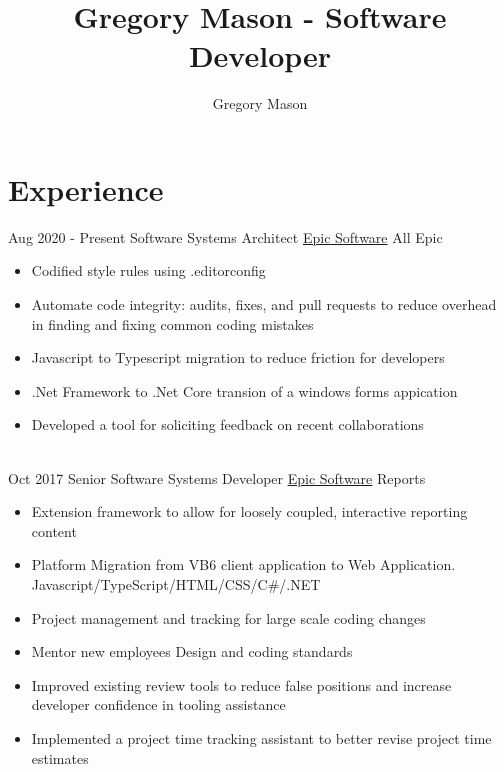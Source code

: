 \documentclass[letterpaper]{twentysecondcv} %
\author{Gregory Mason}
\title{Gregory Mason - Software Developer}
\begin{document}
\makeprofile %


\section{Experience}

\begin{twenty} %
\twentyitem %
{Aug 2020 -}
{Present}
{Software Systems Architect}
{\href{https://www.epic.com/}{Epic Software}}
{All Epic}
{\begin{itemize}
	\item Codified style rules using .editorconfig
	\item Automate code integrity: audits, fixes, and pull requests to reduce overhead in finding and fixing common coding mistakes
	\item Javascript to Typescript migration to reduce friction for developers
	\item .Net Framework to .Net Core transion of a windows forms appication
	\item Developed a tool for soliciting feedback on recent collaborations
\end{itemize}}
\\
\twentyitem
{Oct 2017}
{}
{Senior Software Systems Developer}
{\href{https://www.epic.com/}{Epic Software}}
{Reports}
{\begin{itemize}
	\item Extension framework to allow for loosely coupled, interactive reporting content
	\item Platform Migration from VB6 client application to Web Application. Javascript/TypeScript/HTML/CSS/C\#/.NET
	\item Project management and tracking for large scale coding changes
	\item Mentor new employees Design and coding standards
	\item Improved existing review tools to reduce false positions and increase developer confidence in tooling assistance
	\item Implemented a project time tracking assistant to better revise project time estimates
\end{itemize}}
\\	

\end{twenty}
\end{document}
